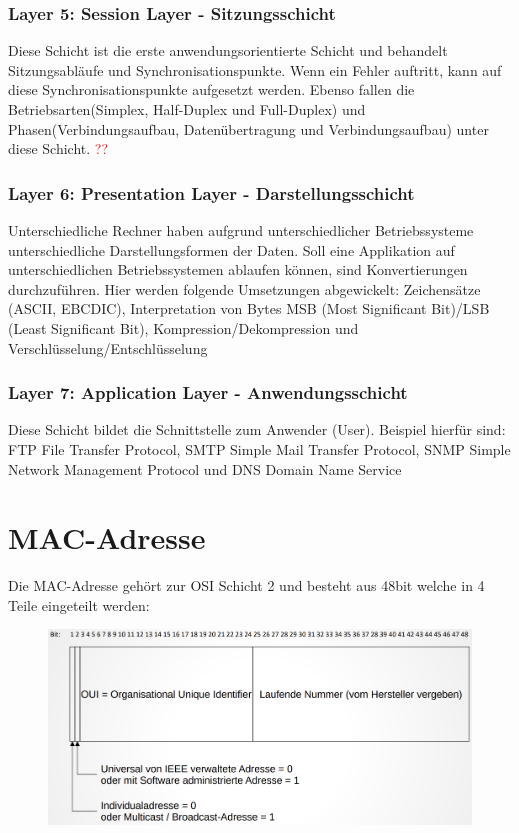 \documentclass[12pt,a4paper]{article}
\begin{document}
			\subsubsection{Layer 5: Session Layer - Sitzungsschicht}
				Diese Schicht ist die erste anwendungsorientierte Schicht und behandelt Sitzungsabläufe und Synchronisationspunkte. Wenn ein Fehler auftritt, kann auf diese Synchronisationspunkte aufgesetzt werden. Ebenso fallen die Betriebsarten(Simplex, Half-Duplex und Full-Duplex) und Phasen(Verbindungsaufbau, Datenübertragung und Verbindungsaufbau) unter diese Schicht. \textcolor{red}{??}

			\subsubsection{Layer 6: Presentation Layer - Darstellungsschicht}
				Unterschiedliche Rechner haben aufgrund unterschiedlicher Betriebssysteme unterschiedliche Darstellungsformen der Daten. Soll eine Applikation auf unterschiedlichen Betriebssystemen ablaufen können, sind Konvertierungen durchzuführen.
				Hier werden folgende Umsetzungen abgewickelt:\newline
				Zeichensätze (ASCII, EBCDIC), Interpretation von Bytes MSB (Most Significant Bit)/LSB (Least Significant Bit), Kompression/Dekompression und Verschlüsselung/Entschlüsselung

			\subsubsection{Layer 7: Application Layer - Anwendungsschicht}
			Diese Schicht bildet die Schnittstelle zum Anwender (User). Beispiel hierfür sind:\newline
			FTP File Transfer Protocol, SMTP Simple Mail Transfer Protocol, SNMP Simple Network Management Protocol und DNS Domain Name Service

	\section{MAC-Adresse}
	Die MAC-Adresse gehört zur OSI Schicht 2 und besteht aus 48bit welche in 4 Teile eingeteilt werden:
	\begin{center}
		\begin{figure}
			\includegraphics[width=\textwidth]{Bilder/MAC-Adresse.PNG}
		\end{figure}
	\end{center}
\end{document}
